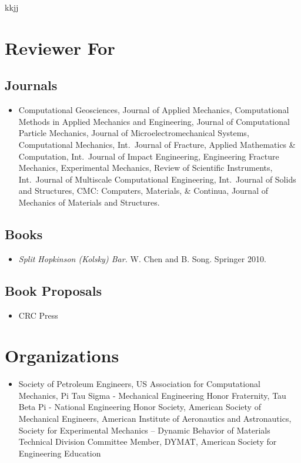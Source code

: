 kkjj\section*{Reviewer For}

\subsection*{Journals}

\begin{itemize}
    \item Computational Geosciences, Journal of Applied Mechanics, Computational Methods in Applied Mechanics and Engineering, Journal of Computational Particle Mechanics, Journal of Microelectromechanical Systems, Computational Mechanics, Int.~Journal of Fracture, Applied Mathematics \& Computation, Int.~Journal of Impact Engineering, Engineering Fracture Mechanics, Experimental Mechanics,  Review of Scientific Instruments, Int.~Journal of Multiscale Computational Engineering, Int.~Journal of Solids and Structures, CMC: Computers, Materials, \& Continua, Journal of Mechanics of Materials and Structures.
\end{itemize}

\subsection*{Books}

\begin{itemize}
    \item {\it Split Hopkinson (Kolsky) Bar.}  W. Chen and B. Song.  Springer 2010.
\end{itemize}

\subsection*{Book Proposals}

\begin{itemize}
    \item CRC Press
\end{itemize}

\section*{Organizations}

\begin{itemize}
    \item Society of Petroleum Engineers, US Association for Computational Mechanics, Pi Tau Sigma - Mechanical Engineering Honor Fraternity, Tau Beta Pi - National Engineering Honor Society, American Society of Mechanical Engineers, American Institute of Aeronautics and Astronautics, Society for Experimental Mechanics -- Dynamic Behavior of Materials Technical Division Committee Member, DYMAT, American Society for Engineering Education
\end{itemize}
